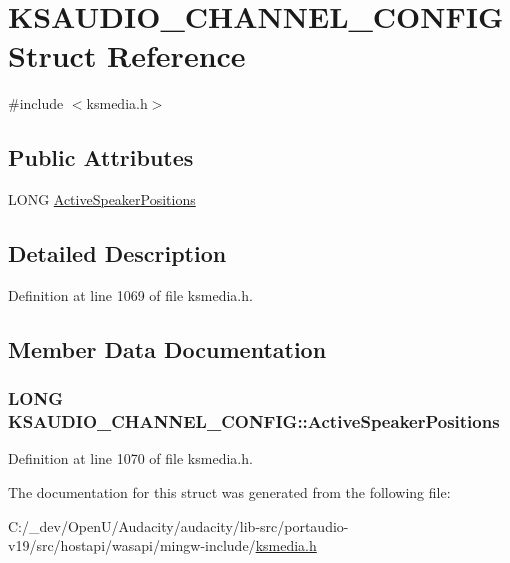 \hypertarget{struct_k_s_a_u_d_i_o___c_h_a_n_n_e_l___c_o_n_f_i_g}{}\section{K\+S\+A\+U\+D\+I\+O\+\_\+\+C\+H\+A\+N\+N\+E\+L\+\_\+\+C\+O\+N\+F\+IG Struct Reference}
\label{struct_k_s_a_u_d_i_o___c_h_a_n_n_e_l___c_o_n_f_i_g}


{\ttfamily \#include $<$ksmedia.\+h$>$}

\subsection*{Public Attributes}
\begin{DoxyCompactItemize}
\item 
L\+O\+NG \hyperlink{struct_k_s_a_u_d_i_o___c_h_a_n_n_e_l___c_o_n_f_i_g_a06f0461b0ca1fda9188d3deee0efa1d3}{Active\+Speaker\+Positions}
\end{DoxyCompactItemize}


\subsection{Detailed Description}


Definition at line 1069 of file ksmedia.\+h.



\subsection{Member Data Documentation}
\subsubsection[{\texorpdfstring{Active\+Speaker\+Positions}{ActiveSpeakerPositions}}]{\setlength{\rightskip}{0pt plus 5cm}L\+O\+NG K\+S\+A\+U\+D\+I\+O\+\_\+\+C\+H\+A\+N\+N\+E\+L\+\_\+\+C\+O\+N\+F\+I\+G\+::\+Active\+Speaker\+Positions}\hypertarget{struct_k_s_a_u_d_i_o___c_h_a_n_n_e_l___c_o_n_f_i_g_a06f0461b0ca1fda9188d3deee0efa1d3}{}\label{struct_k_s_a_u_d_i_o___c_h_a_n_n_e_l___c_o_n_f_i_g_a06f0461b0ca1fda9188d3deee0efa1d3}


Definition at line 1070 of file ksmedia.\+h.



The documentation for this struct was generated from the following file\+:\begin{DoxyCompactItemize}
\item 
C\+:/\+\_\+dev/\+Open\+U/\+Audacity/audacity/lib-\/src/portaudio-\/v19/src/hostapi/wasapi/mingw-\/include/\hyperlink{ksmedia_8h}{ksmedia.\+h}\end{DoxyCompactItemize}

